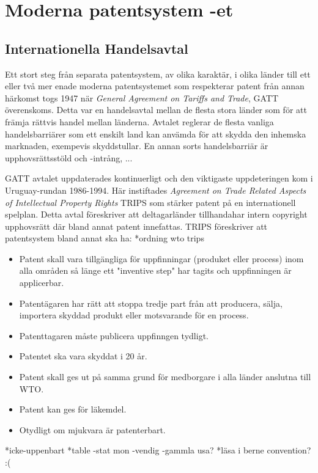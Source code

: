 \section{Moderna patentsystem -et}

\subsection{Internationella Handelsavtal}
Ett stort steg från separata patentsystem, av olika karaktär, i olika länder till ett eller två mer enade moderna patentsystemet som respekterar patent från annan härkomst togs 1947 när \emph{General Agreement on Tariffs and Trade}, GATT överenskoms. Detta var en handelsavtal mellan de flesta stora länder som för att främja rättvis handel mellan länderna. \cite{gatt} Avtalet reglerar de flesta vanliga handelsbarriärer som ett enskilt land kan anvämda för att skydda den inhemska marknaden, exempevis skyddstullar. En annan sorts handelsbarriär är upphovsrättsstöld och -intrång, ...

GATT avtalet uppdaterades kontinuerligt och den viktigaste uppdeteringen kom i Uruguay-rundan 1986-1994. Här instiftades \emph{Agreement on Trade Related Aspects of Intellectual Property Rights} TRIPS som stärker patent på en internationell spelplan. Detta avtal föreskriver att deltagarländer tillhandahar intern copyright upphovsrätt där bland annat patent innefattas. TRIPS föreskriver att patentsystem bland annat ska ha:
*ordning wto trips

\begin{itemize}
	\item Patent skall vara tillgängliga för uppfinningar (produket eller process) inom alla områden så länge ett "inventive step" har tagits och uppfinningen är applicerbar.
	\item Patentägaren har rätt att stoppa tredje part från att producera, sälja, importera skyddad produkt eller motsvarande för en process.
	\item Patenttagaren måste publicera uppfinngen tydligt.
	\item Patentet ska vara skyddat i 20 år.
	\item Patent skall ges ut på samma grund för medborgare i alla länder anslutna till WTO.
	\item Patent kan ges för läkemdel.
	\item Otydligt om mjukvara är patenterbart.
\end{itemize}	
*icke-uppenbart
*table -stat mon -vendig -gammla usa? 
*läsa i berne convention? :(

